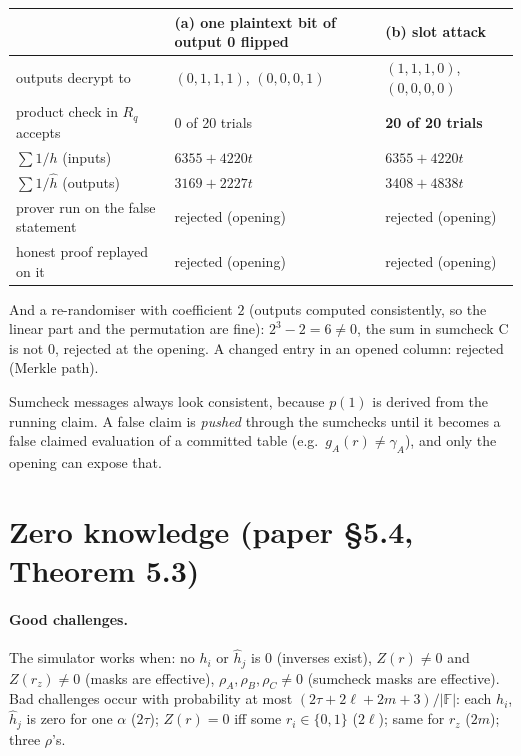 \documentclass[11pt,a4paper]{article}
\newcommand{\Rq}{R_q}
\newcommand{\F}{\mathbb{F}}
\newcommand{\hh}{\hat{h}}
\theoremstyle{definition}
\theoremstyle{plain}
\begin{document}
\begin{toyrun}
\begin{center}\small
\begin{tabular}{@{}lll@{}}
\toprule
 & (a) one plaintext bit of output 0 flipped & (b) slot attack\\\midrule
outputs decrypt to & $(0,1,1,1)$, $(0,0,0,1)$ & $(1,1,1,0)$, $(0,0,0,0)$\\
product check in $\Rq$ accepts & 0 of 20 trials & \textbf{20 of 20 trials}\\
$\sum 1/h$ (inputs) & $6355{+}4220t$ & $6355{+}4220t$\\
$\sum 1/\hh$ (outputs) & $3169{+}2227t$ & $3408{+}4838t$\\
prover run on the false statement & rejected (opening) & rejected (opening)\\
honest proof replayed on it & rejected (opening) & rejected (opening)\\
\bottomrule
\end{tabular}
\end{center}
And a re-randomiser with coefficient $2$ (outputs computed consistently, so the linear part and the
permutation are fine): $2^3-2=6\neq 0$, the sum in sumcheck C is not $0$, rejected at the opening.
A changed entry in an opened column: rejected (Merkle path).
\end{toyrun}

\begin{why}
Sumcheck messages always look consistent, because $p(1)$ is derived from the running claim. A false
claim is \emph{pushed} through the sumchecks until it becomes a false claimed evaluation of a committed
table (e.g.\ $g_A(r)\neq\gamma_A$), and only the opening can expose that.
\end{why}

\section{Zero knowledge (paper \S5.4, Theorem 5.3)}
\label{sec:zk}

\paragraph{Good challenges.} The simulator works when: no $h_i$ or $\hh_j$ is $0$ (inverses exist),
$Z(r)\neq 0$ and $Z(r_z)\neq 0$ (masks are effective), $\rho_A,\rho_B,\rho_C\neq 0$ (sumcheck masks are
effective). Bad challenges occur with probability at most $(2\tau+2\ell+2m+3)/|\F|$: each $h_i$, $\hh_j$ is
zero for one $\alpha$ ($2\tau$); $Z(r)=0$ iff some $r_i\in\{0,1\}$ ($2\ell$); same for $r_z$ ($2m$); three $\rho$'s.
\end{document}
